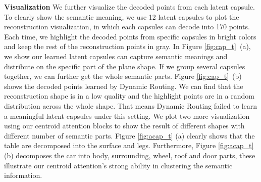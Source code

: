 \documentclass[english]{article}
\begin{document}
\begin{table}[ht]
    \centering
    \caption{Comparison between the performance of dynamic routing and our centroid attention method
    under different latent capsules number settings (MBS/GPU = Maximum Batch Size per GPU, CD = Chamfer Distance). Here the Chamfer Distance is a metric for evaluating the quality of reconstruction. }
    \label{tab:cap}
\end{table}





\textbf{Visualization} \space We further visualize the decoded points from each latent capsule. To clearly show the semantic meaning, we use 12 latent capsules to plot the reconstruction visualization, in which each capsules can decode into 170 points. Each time, we highlight the decoded points from specific capsules in bright colors and keep the rest of the reconstruction points in gray. In Figure \ref{fig:cap_t}~(a), we show our learned latent capsules can capture semantic meanings and distribute on the specific part of the plane shape. If we group several capsules together, we can further get the whole semantic parts. Figure \ref{fig:cap_t}~(b) shows the decoded points learned by Dynamic Routing. We can find that the reconstruction shape is in a low quality and the highlight points are in a random distribution across the whole shape. That means Dynamic Routing failed to learn a meaningful latent capsules under this setting. We plot two more visualization using our centroid attention blocks to show the result of different shapes with different number of semantic parts. Figure \ref{fig:acap_t} (a) clearly shows that the table are decomposed into the surface and legs. Furthermore, Figure \ref{fig:acap_t} (b) decomposes the car into body, surrounding, wheel, roof and door parts, these illustrate our centroid attention's strong ability in clustering the semantic information.
\end{document}
